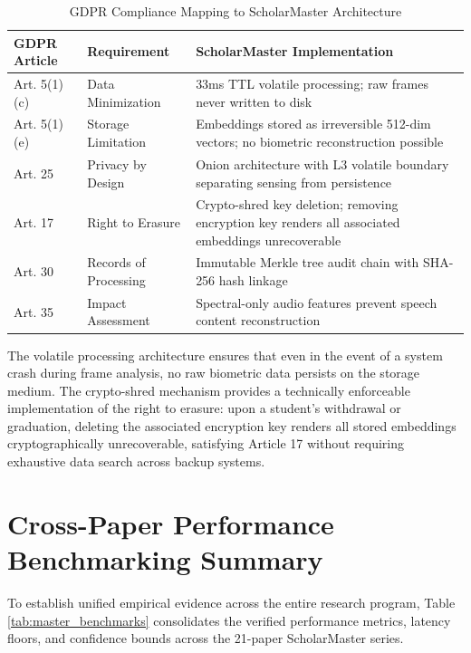 \documentclass[12pt,a4paper,oneside]{report}
\begin{document}
\begin{table}[htbp]
\caption{GDPR Compliance Mapping to ScholarMaster Architecture}
\centering
\small
{}
\setlength{\tabcolsep}{4pt}
\begin{tabular}{@{}p{0.8in} p{1.5in} p{2.7in}@{}}
\hline
\textbf{GDPR Article} & \textbf{Requirement} & \textbf{ScholarMaster Implementation} \\ \hline
Art. 5(1)(c) & Data Minimization & 33ms TTL volatile processing; raw frames never written to disk \\
Art. 5(1)(e) & Storage Limitation & Embeddings stored as irreversible 512-dim vectors; no biometric reconstruction possible \\
Art. 25 & Privacy by Design & Onion architecture with L3 volatile boundary separating sensing from persistence \\
Art. 17 & Right to Erasure & Crypto-shred key deletion; removing encryption key renders all associated embeddings unrecoverable \\
Art. 30 & Records of Processing & Immutable Merkle tree audit chain with SHA-256 hash linkage \\
Art. 35 & Impact Assessment & Spectral-only audio features prevent speech content reconstruction \\ \hline
\end{tabular}
\label{tab:gdpr_compliance}
\end{table}

The volatile processing architecture ensures that even in the event of a system crash during frame analysis, no raw biometric data persists on the storage medium. The crypto-shred mechanism provides a technically enforceable implementation of the right to erasure: upon a student's withdrawal or graduation, deleting the associated encryption key renders all stored embeddings cryptographically unrecoverable, satisfying Article 17 without requiring exhaustive data search across backup systems.

\section{Cross-Paper Performance Benchmarking Summary}
To establish unified empirical evidence across the entire research program, Table \ref{tab:master_benchmarks} consolidates the verified performance metrics, latency floors, and confidence bounds across the 21-paper ScholarMaster series.
\end{document}
